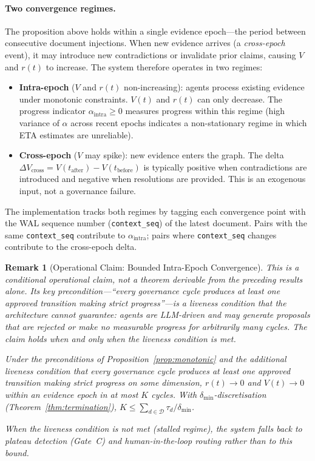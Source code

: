 \documentclass[11pt]{article}
\newtheorem{remark}{Remark}
\begin{document}
\paragraph{Two convergence regimes.} The proposition above holds within a single evidence epoch---the period between consecutive document injections. When new evidence arrives (a \emph{cross-epoch} event), it may introduce new contradictions or invalidate prior claims, causing $V$ and $r(t)$ to increase. The system therefore operates in two regimes:

\begin{itemize}
  \item \textbf{Intra-epoch} ($V$ and $r(t)$ non-increasing): agents process existing evidence under monotonic constraints. $V(t)$ and $r(t)$ can only decrease. The progress indicator $\alpha_{\text{intra}} \geq 0$ measures progress within this regime (high variance of $\alpha$ across recent epochs indicates a non-stationary regime in which ETA estimates are unreliable).
  \item \textbf{Cross-epoch} ($V$ may spike): new evidence enters the graph. The delta $\Delta V_{\text{cross}} = V(t_{\text{after}}) - V(t_{\text{before}})$ is typically positive when contradictions are introduced and negative when resolutions are provided. This is an exogenous input, not a governance failure.
\end{itemize}

The implementation tracks both regimes by tagging each convergence point with the WAL sequence number (\texttt{context\_seq}) of the latest document. Pairs with the same \texttt{context\_seq} contribute to $\alpha_{\text{intra}}$; pairs where \texttt{context\_seq} changes contribute to the cross-epoch delta.

\begin{remark}[Operational Claim: Bounded Intra-Epoch Convergence]
\label{rem:bounded-convergence}
This is a \emph{conditional operational claim}, not a theorem derivable from the preceding results alone. Its key precondition---``every governance cycle produces at least one approved transition making strict progress''---is a \emph{liveness} condition that the architecture cannot guarantee: agents are LLM-driven and may generate proposals that are rejected or make no measurable progress for arbitrarily many cycles. The claim holds when and only when the liveness condition is met.

Under the preconditions of Proposition~\ref{prop:monotonic} \emph{and} the additional liveness condition that every governance cycle produces at least one approved transition making strict progress on some dimension, $r(t) \to 0$ and $V(t) \to 0$ within an evidence epoch in at most $K$ cycles. With $\delta_{\min}$-discretisation (Theorem~\ref{thm:termination}), $K \leq \sum_{d \in \mathcal{D}} \tau_d / \delta_{\min}$.

When the liveness condition is not met (stalled regime), the system falls back to plateau detection (Gate~C) and human-in-the-loop routing rather than to this bound.
\end{remark}
\end{document}
